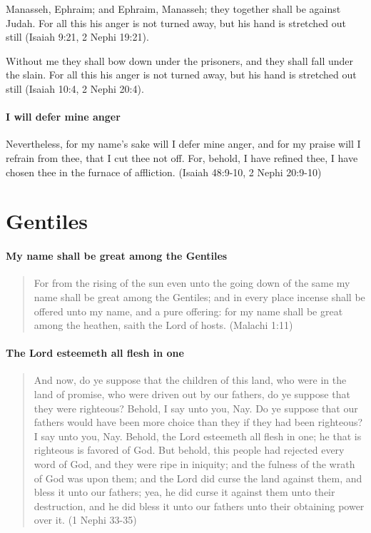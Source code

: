 Manasseh, Ephraim; and Ephraim, Manasseh; they together shall be against Judah. For all this his anger is not turned away, but his hand is stretched out still (Isaiah 9:21, 2 Nephi 19:21).

Without me they shall bow down under the prisoners, and they shall fall under the slain. For all this his anger is not turned away, but his hand is stretched out still (Isaiah 10:4, 2 Nephi 20:4).

\paragraph{I will defer mine anger}
Nevertheless, for my name's sake will I defer mine anger, and for my praise will I refrain from thee, that I cut thee not off. For, behold, I have refined thee, I have chosen thee in the furnace of affliction. (Isaiah 48:9-10, 2 Nephi 20:9-10)


\section{Gentiles}

\paragraph{My name shall be great among the Gentiles}
\begin{quotation}
For from the rising of the sun even unto the going down of the same my name shall be great among the Gentiles; and in every place incense shall be offered unto my name, and a pure offering: for my name shall be great among the heathen, saith the Lord of hosts. (Malachi 1:11)
\end{quotation}

\paragraph{The Lord esteemeth all flesh in one}
\begin{quotation}
And now, do ye suppose that the children of this land, who were in the land of promise, who were driven out by our fathers, do ye suppose that they were righteous? Behold, I say unto you, Nay. Do ye suppose that our fathers would have been more choice than they if they had been righteous? I say unto you, Nay. Behold, the Lord esteemeth all flesh in one; he that is righteous is favored of God. But behold, this people had rejected every word of God, and they were ripe in iniquity; and the fulness of the wrath of God was upon them; and the Lord did curse the land against them, and bless it unto our fathers; yea, he did curse it against them unto their destruction, and he did bless it unto our fathers unto their obtaining power over it. (1 Nephi 33-35)
\end{quotation}

